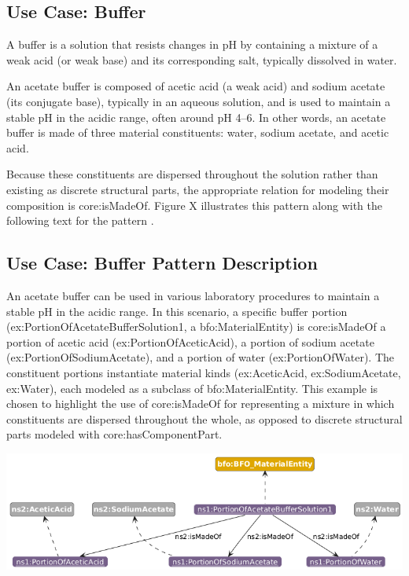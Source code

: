 \subsection*{Use Case: Buffer}
A buffer is a solution that resists changes in pH by containing a mixture of a weak acid (or weak base) and its corresponding salt, typically dissolved in water.

An acetate buffer is composed of acetic acid (a weak acid) and sodium acetate (its conjugate base), typically in an aqueous solution, and is used to maintain a stable pH in the acidic range, often around pH 4–6. In other words, an acetate buffer is made of three material constituents: water, sodium acetate, and acetic acid.

Because these constituents are dispersed throughout the solution rather than existing as discrete structural parts, the appropriate relation for modeling their composition is core:isMadeOf. Figure X illustrates this pattern along with the following text for the pattern .


\subsection*{Use Case: Buffer Pattern Description}
An acetate buffer can be used in various laboratory procedures to maintain a stable pH in the acidic range. In this scenario, a specific buffer portion (ex:PortionOfAcetateBufferSolution1, a bfo:MaterialEntity) is core:isMadeOf a portion of acetic acid (ex:PortionOfAceticAcid), a portion of sodium acetate (ex:PortionOfSodiumAcetate), and a portion of water (ex:PortionOfWater). The constituent portions instantiate material kinds (ex:AceticAcid, ex:SodiumAcetate, ex:Water), each modeled as a subclass of bfo:MaterialEntity.
This example is chosen to highlight the use of core:isMadeOf for representing a mixture in which constituents are dispersed throughout the whole, as opposed to discrete structural parts modeled with core:hasComponentPart.

\includegraphics[scale=0.5]{scenarios/object-artifact-material/image/buffer.rdf.png}

